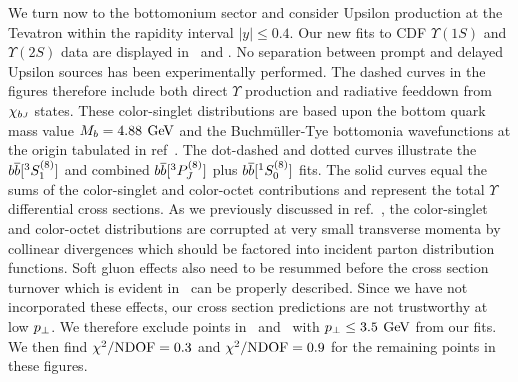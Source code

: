 	We turn now to the bottomonium sector and consider Upsilon production 
at the Tevatron within the rapidity interval $|y| \le 0.4$.  Our new fits to 
CDF $\Upsilon(1S)$ and $\Upsilon(2S)$ data are displayed in 
\UpsilononeSxsect\ and \UpsilontwoSxsect.  No separation between prompt and 
delayed Upsilon sources has been experimentally performed.  The dashed 
curves in the figures therefore include both direct $\Upsilon$ production 
and radiative feeddown from $\chi_{b{\scriptscriptstyle J}}$ states.  These color-singlet 
distributions are based upon the bottom quark mass value $M_b = 4.88 
{\>\, \rm GeV}$ and the Buchm\"uller-Tye bottomonia wavefunctions at the origin 
tabulated in ref~\Quigg.  The dot-dashed and dotted curves illustrate the 
$b{\overline b}[^3S_1^{(8)}]$ and combined $b{\overline b}[^3P_J^{(8)}]$ plus $b{\overline b}[^1S_0^{(8)}]$ 
fits.  The solid curves equal the sums of the color-singlet and color-octet 
contributions and represent the total 
$\Upsilon$ differential cross sections.  As we previously discussed in 
ref.~\ChoLeibov, the color-singlet and color-octet distributions are 
corrupted at very small transverse momenta by collinear divergences which 
should be factored into incident parton distribution functions.  Soft gluon 
effects also need to be resummed before the cross section turnover which is 
evident in \UpsilononeSxsect\ can be properly described.  Since we have not 
incorporated these effects, our cross section predictions are not trustworthy 
at low $p_\perp$.  We therefore exclude points in \UpsilononeSxsect\ and 
\UpsilontwoSxsect\ with $p_\perp \le 3.5 {\>\, \rm GeV}$ from our fits.  We then find 
$\chi^2/{\rm NDOF} = 0.3$ and $\chi^2/{\rm NDOF} = 0.9$ for the remaining points in 
these figures. 

